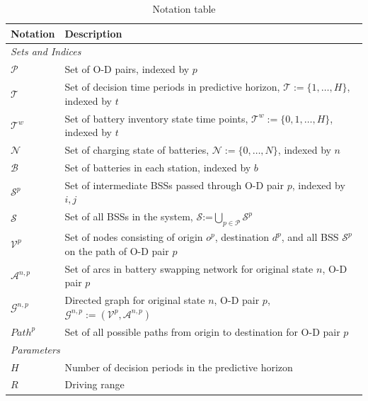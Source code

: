 \documentclass[12pt,hyperref,a4paper,UTF8]{ctexart}
\begin{document}
\begin{table}[!htbp]
  \centering
  \caption{Notation table}
  \label{tab:notation}
  \footnotesize
  \setlength{\tabcolsep}{1pt}
  \renewcommand{\arraystretch}{0.85}
  \begin{tabular}{@{}lp{13cm}@{}}
    \toprule
    \textbf{Notation} & \textbf{Description} \\
    \midrule
    \multicolumn{2}{l}{\textit{Sets and Indices}} \\
    $\mathcal{P}$ & Set of O-D pairs, indexed by $p$\\
    $\mathcal{T}$ & Set of decision time periods in predictive horizon, $\mathcal{T}:=\{1,\dots,H\}$, indexed by $t$ \\
    $\mathcal{T}^{w}$ & Set of battery inventory state time points, $\mathcal{T}^{w}:=\{0,1,\dots,H\}$, indexed by $t$ \\
    $\mathcal{N}$ & Set of charging state of batteries, $\mathcal{N}:=\{0,\dots,N\}$, indexed by $n$\\
    $\mathcal{B}$ & Set of batteries in each station, indexed by $b$ \\
    $\mathcal{S}^p$ & Set of intermediate BSSs passed through O-D pair $p$, indexed by $i, j$ \\
    $\mathcal{S}$ & Set of all BSSs in the system, $\mathcal{S}$:=$\bigcup_{p \in \mathcal{P}}\mathcal{S}^p$\\
    $\mathcal{V}^p$ & Set of nodes consisting of origin $o^p$, destination $d^p$, and all BSS $\mathcal{S}^p$ on the path of O-D pair $p$ \\  
    $\mathcal{A}^{n,p}$ & Set of arcs in battery swapping network for original state $n$, O-D pair $p$ \\
    $\mathcal{G}^{n,p}$ & Directed graph for original state $n$, O-D pair $p$, $\mathcal{G}^{n,p}:=(\mathcal{V}^p,\mathcal{A}^{n,p})$ \\
    $Path^p$ & Set of all possible paths from origin to destination for O-D pair $p$ \\
    \midrule
    \multicolumn{2}{l}{\textit{Parameters}} \\
    $H$ & Number of decision periods in the predictive horizon \\
    $R$ & Driving range \\

\end{tabular}
\end{table}
\end{document}

